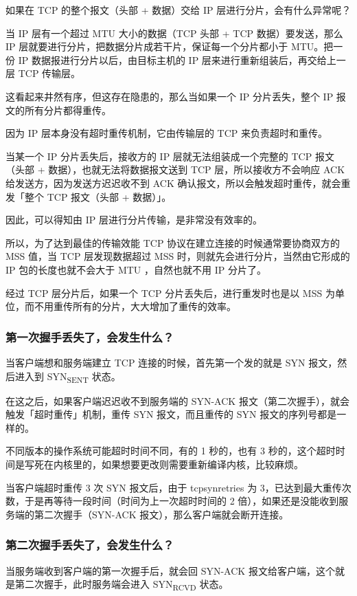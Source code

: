 \documentclass[11pt]{article}
\begin{document}
如果在 TCP 的整个报文（头部 + 数据）交给 IP 层进行分片，会有什么异常呢？

当 IP 层有一个超过 MTU 大小的数据（TCP 头部 + TCP 数据）要发送，那么 IP 层就要进行分片，把数据分片成若干片，保证每一个分片都小于 MTU。把一份 IP 数据报进行分片以后，由目标主机的 IP 层来进行重新组装后，再交给上一层 TCP 传输层。

这看起来井然有序，但这存在隐患的，那么当如果一个 IP 分片丢失，整个 IP 报文的所有分片都得重传。

因为 IP 层本身没有超时重传机制，它由传输层的 TCP 来负责超时和重传。

当某一个 IP 分片丢失后，接收方的 IP 层就无法组装成一个完整的 TCP 报文（头部 + 数据），也就无法将数据报文送到 TCP 层，所以接收方不会响应 ACK 给发送方，因为发送方迟迟收不到 ACK 确认报文，所以会触发超时重传，就会重发「整个 TCP 报文（头部 + 数据）」。

因此，可以得知由 IP 层进行分片传输，是非常没有效率的。

所以，为了达到最佳的传输效能 TCP 协议在建立连接的时候通常要协商双方的 MSS 值，当 TCP 层发现数据超过 MSS 时，则就先会进行分片，当然由它形成的 IP 包的长度也就不会大于 MTU ，自然也就不用 IP 分片了。

经过 TCP 层分片后，如果一个 TCP 分片丢失后，进行重发时也是以 MSS 为单位，而不用重传所有的分片，大大增加了重传的效率。
\subsubsection{第一次握手丢失了，会发生什么？}
\label{sec:orgc959be0}
当客户端想和服务端建立 TCP 连接的时候，首先第一个发的就是 SYN 报文，然后进入到 SYN\textsubscript{SENT} 状态。

在这之后，如果客户端迟迟收不到服务端的 SYN-ACK 报文（第二次握手），就会触发「超时重传」机制，重传 SYN 报文，而且重传的 SYN 报文的序列号都是一样的。

不同版本的操作系统可能超时时间不同，有的 1 秒的，也有 3 秒的，这个超时时间是写死在内核里的，如果想要更改则需要重新编译内核，比较麻烦。

当客户端超时重传 3 次 SYN 报文后，由于 tcpsynretries 为 3，已达到最大重传次数，于是再等待一段时间（时间为上一次超时时间的 2 倍），如果还是没能收到服务端的第二次握手（SYN-ACK 报文），那么客户端就会断开连接。
\subsubsection{第二次握手丢失了，会发生什么？}
\label{sec:org0e843f7}
当服务端收到客户端的第一次握手后，就会回 SYN-ACK 报文给客户端，这个就是第二次握手，此时服务端会进入 SYN\textsubscript{RCVD} 状态。
\end{document}
